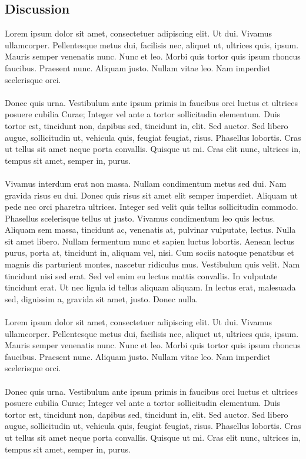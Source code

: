 \documentclass[a0,final]{a0poster}
\begin{document}
\begin{multicols}{3}
\section*{Discussion}
Lorem ipsum dolor sit amet, consectetuer adipiscing elit. Ut dui. Vivamus ullamcorper. Pellentesque metus dui, facilisis nec, aliquet ut, ultrices quis, ipsum. Mauris semper venenatis nunc. Nunc et leo. Morbi quis tortor quis ipsum rhoncus faucibus. Praesent nunc. Aliquam justo. Nullam vitae leo. Nam imperdiet scelerisque orci.\\
\\
Donec quis urna. Vestibulum ante ipsum primis in faucibus orci luctus et ultrices posuere cubilia Curae; Integer vel ante a tortor sollicitudin elementum. Duis tortor est, tincidunt non, dapibus sed, tincidunt in, elit. Sed auctor. Sed libero augue, sollicitudin ut, vehicula quis, feugiat feugiat, risus. Phasellus lobortis. Cras ut tellus sit amet neque porta convallis. Quisque ut mi. Cras elit nunc, ultrices in, tempus sit amet, semper in, purus.\\
\\
Vivamus interdum erat non massa. Nullam condimentum metus sed dui. Nam gravida risus eu dui. Donec quis risus sit amet elit semper imperdiet. Aliquam ut pede nec orci pharetra ultrices. Integer sed velit quis tellus sollicitudin commodo. Phasellus scelerisque tellus ut justo. Vivamus condimentum leo quis lectus. Aliquam sem massa, tincidunt ac, venenatis at, pulvinar vulputate, lectus. Nulla sit amet libero. Nullam fermentum nunc et sapien luctus lobortis. Aenean lectus purus, porta at, tincidunt in, aliquam vel, nisi. Cum sociis natoque penatibus et magnis dis parturient montes, nascetur ridiculus mus. Vestibulum quis velit. Nam tincidunt nisi sed erat. Sed vel enim eu lectus mattis convallis. In vulputate tincidunt erat. Ut nec ligula id tellus aliquam aliquam. In lectus erat, malesuada sed, dignissim a, gravida sit amet, justo. Donec nulla.\\
\\
Lorem ipsum dolor sit amet, consectetuer adipiscing elit. Ut dui. Vivamus ullamcorper. Pellentesque metus dui, facilisis nec, aliquet ut, ultrices quis, ipsum. Mauris semper venenatis nunc. Nunc et leo. Morbi quis tortor quis ipsum rhoncus faucibus. Praesent nunc. Aliquam justo. Nullam vitae leo. Nam imperdiet scelerisque orci.\\
\\
Donec quis urna. Vestibulum ante ipsum primis in faucibus orci luctus et ultrices posuere cubilia Curae; Integer vel ante a tortor sollicitudin elementum. Duis tortor est, tincidunt non, dapibus sed, tincidunt in, elit. Sed auctor. Sed libero augue, sollicitudin ut, vehicula quis, feugiat feugiat, risus. Phasellus lobortis. Cras ut tellus sit amet neque porta convallis. Quisque ut mi. Cras elit nunc, ultrices in, tempus sit amet, semper in, purus.\\

\end{multicols}
\end{document}
